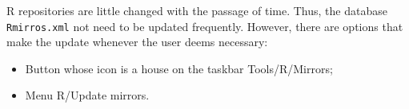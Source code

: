 R repositories are little changed with the passage of time.
Thus, the database \texttt{Rmirros.xml} not need to be updated frequently.
However, there are options that make the update whenever the user deems necessary:
\begin{itemize}
   \item Button whose icon is a house on the taskbar Tools/R/Mirrors;
   \item Menu R/Update mirrors.
\end{itemize}
